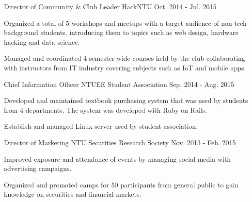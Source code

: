   \begin{cventries}
    \cventry
      {Director of Community \& Club Leader}
      {HackNTU}
      {Oct. 2014 - Jul. 2015}
      {}
      {
        \begin{cvitems}
          \item {Organized a total of 5 workshops and meetups with a target audience of non-tech background students, introducing them to topics such as web design, hardware hacking and data science.}
          \item {Managed and coordinated 4 semester-wide courses held by the club collaborating with instructors from IT industry covering subjects such as IoT and mobile apps. }
        \end{cvitems}
      }
    \cventry
      {Chief Information Officer}
      {NTUEE Student Association}
      {Sep. 2014 - Aug. 2015}
      {}
      {
        \begin{cvitems}
          \item {Developed and maintained textbook purchasing system that was used by students from 4 departments. The system was developed with Ruby on Rails.}
          \item {Establish and managed Linux server used by student association.}
        \end{cvitems}
      }
    \cventry
      {Director of Marketing}
      {NTU Securities Research Society}
      {Nov. 2013 - Feb. 2015}
      {}
      {
        \begin{cvitems} %
          \item {Improved exposure and attendance of events by managing social media with advertising campaigns.}
          \item {Organized and promoted camps for 50 participants from general public to gain knowledge on securities and financial markets.}
        \end{cvitems}
      }
  \end{cventries}
